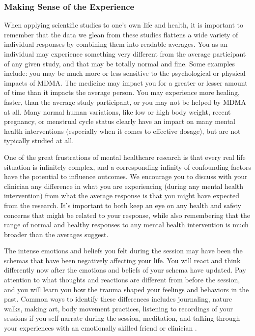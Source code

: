 \documentclass[12pt,letterpaper]{article}
\begin{document}
\subsubsection{Making Sense of the Experience}
\label{sectionMakingSense}
When applying scientific studies to one's own life and health, it is important to remember that the data we glean from these studies flattens a wide variety of individual responses by combining them into readable averages. You as an individual may experience something very different from the average participant of any given study, and that may be totally normal and fine. Some examples include: you may be much more or less sensitive to the psychological or physical impacts of MDMA. The medicine may impact you for a greater or lesser amount of time than it impacts the average person. You may experience more healing, faster, than the average study participant, or you may not be helped by MDMA at all. Many normal human variations, like low or high body weight, recent pregnancy, or menstrual cycle status clearly have an impact on many mental health interventions (especially when it comes to effective dosage), but are not typically studied at all.

One of the great frustrations of mental healthcare research is that every real life situation is infinitely complex, and a corresponding infinity of confounding factors have the potential to influence outcomes. We encourage you to discuss with your clinician any difference in what you are experiencing (during any mental health intervention) from what the average response is that you might have expected from the research. It's important to both keep an eye on any health and safety concerns that might be related to your response, while also remembering that the range of normal and healthy responses to any mental health intervention is much broader than the averages suggest.

The intense emotions and beliefs you felt during the session may have been the schemas that have been negatively affecting your life. You will react and think differently now after the emotions and beliefs of your schema have updated. Pay attention to what thoughts and reactions are different from before the session, and you will learn you how the trauma shaped your feelings and behaviors in the past. Common ways to identify these differences includes journaling, nature walks, making art, body movement practices, listening to recordings of your sessions if you self-narrate during the session, meditation, and talking through your experiences with an emotionally skilled friend or clinician \cite{mithoeferManual}.
\end{document}
